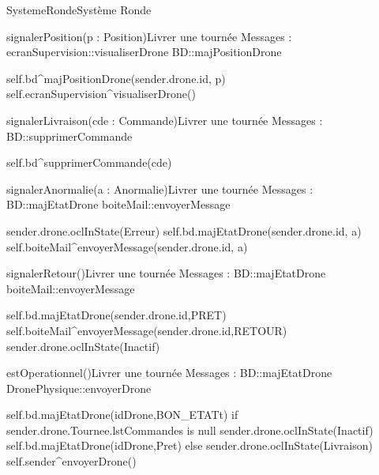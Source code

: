 \begin{OM}{SystemeRonde}{Système Ronde}
\begin{OMOperation}{signalerPosition(p : Position)}{Livrer une tournée}{}
Messages :
ecranSupervision::{visualiserDrone}
BD::{majPositionDrone}
\begin{OMPre}
\end{OMPre}
\begin{OMPost}
self.bd^majPositionDrone(sender.drone.id, p)
self.ecranSupervision^visualiserDrone()
\end{OMPost}
\end{OMOperation}

\begin{OMOperation}{signalerLivraison(cde : Commande)}{Livrer une tournée}{}
Messages :
BD::{supprimerCommande}
\begin{OMPre}
\end{OMPre}
\begin{OMPost}
self.bd^supprimerCommande(cde)
\end{OMPost}
\end{OMOperation}

\begin{OMOperation}{signalerAnormalie(a : Anormalie)}{Livrer une tournée}{}
Messages :
BD::{majEtatDrone}
boiteMail::{envoyerMessage}
\begin{OMPre}
\end{OMPre}
\begin{OMPost}
sender.drone.oclInState(Erreur)
self.bd.majEtatDrone(sender.drone.id, a)
self.boiteMail^envoyerMessage(sender.drone.id, a)
\end{OMPost}
\end{OMOperation}

\begin{OMOperation}{signalerRetour()}{Livrer une tournée}{}
Messages :
BD::{majEtatDrone}
boiteMail::{envoyerMessage}
\begin{OMPre}
\end{OMPre}
\begin{OMPost}
        self.bd.majEtatDrone(sender.drone.id,PRET)
        self.boiteMail^envoyerMessage(sender.drone.id,RETOUR)
        sender.drone.oclInState(Inactif)
    \end{OMPost}
\end{OMOperation}

\begin{OMOperation}{estOperationnel()}{Livrer une tournée}{}
Messages :
BD::{majEtatDrone}
DronePhysique::{envoyerDrone}
\begin{OMPre}
\end{OMPre}
\begin{OMPost}
        self.bd.majEtatDrone(idDrone,BON_ETATt)
        if sender.drone.Tournee.lstCommandes is null
                sender.drone.oclInState(Inactif)
                self.bd.majEtatDrone(idDrone,Pret)
        else
                sender.drone.oclInState(Livraison)
                self.sender^envoyerDrone()
            \end{OMPost}
\end{OMOperation}
\end{OM}

